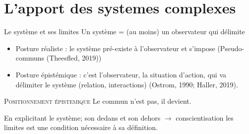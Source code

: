 \documentclass[newPxFont]{beamer}
\begin{document}

\section{L'apport des systemes complexes}

\begin{frame}[c]{Le système et ses limites}
\vspace{-1cm}
Un système = (au moins) un observateur qui délimite
\begin{itemize}
  \item Posture réaliste : le système pré-existe à l'observateur et s'impose (Pseudo-communs (Theesfled, 2019))
  \item Posture épistémique : c'est l'observateur, la situation d'action, qui va délimiter le système (relation, interactions) (Ostrom, 1990; Haller, 2019).
\end{itemize}

\small{
  \begin{alertblock}{\textsc{Positionnement épistemique}}
      Le commun n'est pas, il devient.
  \end{alertblock}
}

En explicitant le système; son dedans et son dehors $\rightarrow$  conscientisation les limites est une condition nécessaire à sa définition.


\end{frame}
\end{document}
